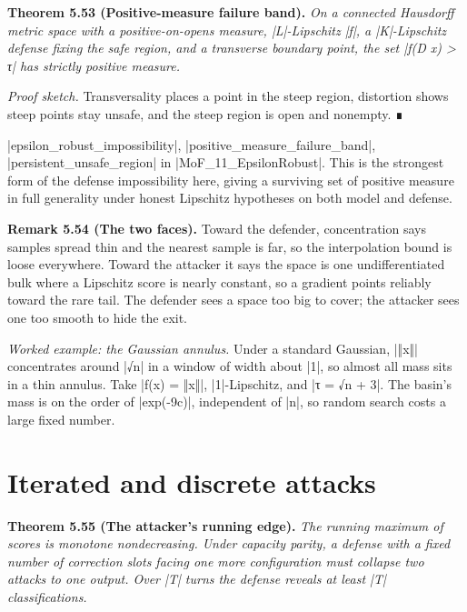 \documentclass{memoir}
\begin{document}
\textbf{Theorem 5.53 (Positive-measure failure band).} \emph{On a connected Hausdorff metric space
with a positive-on-opens measure, \LeanVerb|L|-Lipschitz \LeanVerb|f|, a \LeanVerb|K|-Lipschitz defense
fixing the safe region, and a transverse boundary point, the set \LeanVerb|f(D x) > τ|
has strictly positive measure.}

\emph{Proof sketch.} Transversality places a point in the steep region, distortion shows steep
points stay unsafe, and the steep region is open and nonempty. ∎

\LeanVerb|epsilon_robust_impossibility|, \LeanVerb|positive_measure_failure_band|,
\LeanVerb|persistent_unsafe_region| in \LeanVerb|MoF_11_EpsilonRobust|. This is the strongest form
of the defense impossibility here, giving a surviving set of positive measure in
full generality under honest Lipschitz hypotheses on both model and defense.

\textbf{Remark 5.54 (The two faces).} Toward the defender, concentration says samples spread thin
and the nearest sample is far, so the interpolation bound is loose everywhere.
Toward the attacker it says the space is one undifferentiated bulk where a
Lipschitz score is nearly constant, so a gradient points reliably toward the
rare tail. The defender sees a space too big to cover; the attacker sees one too
smooth to hide the exit.

\emph{Worked example: the Gaussian annulus.} Under a standard Gaussian, \LeanVerb|‖x‖|
concentrates around \LeanVerb|√n| in a window of width about \LeanVerb|1|, so almost all mass sits
in a thin annulus. Take \LeanVerb|f(x) = ‖x‖|, \LeanVerb|1|-Lipschitz, and \LeanVerb|τ = √n + 3|. The
basin's mass is on the order of \LeanVerb|exp(-9c)|, independent of \LeanVerb|n|, so random search
costs a large fixed number.



\section{Iterated and discrete attacks}\label{Two--Schemas--of--Impossibility-005F-005F-005F--Machine--Checked--Limits--of--Trustworthy--Machine--Learning-005F-005F-005F--and--Why--They--Tighten--with--Capability----The--Geometry--of--Attacks----Iterated--and--discrete--attacks}

\textbf{Theorem 5.55 (The attacker's running edge).} \emph{The running maximum of scores is monotone
nondecreasing. Under capacity parity, a defense with a fixed number of
correction slots facing one more configuration must collapse two attacks to one
output. Over \LeanVerb|T| turns the defense reveals at least \LeanVerb|T| classifications.}
\end{document}
